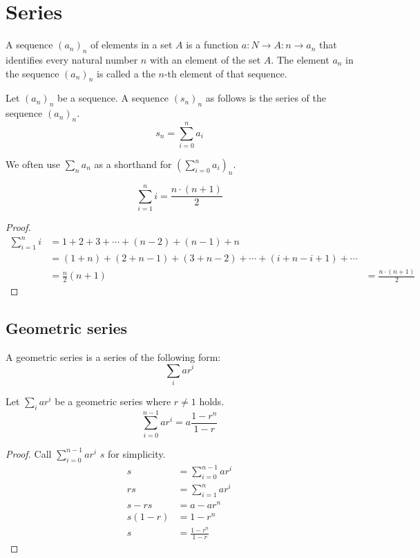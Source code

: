\documentclass[main.tex]{subfiles}
\begin{document}
\chapter{Series}

\begin{de}
  A sequence $(a_{n})_{n}$ of elements in a set $A$ is a function $a: N
  \rightarrow A: n \rightarrow a_{n}$ that identifies every natural number $n$ with an element of
  the set $A$. The element $a_{n}$ in the sequence $(a_{n})_{n}$ is called a the
  $n$-th element of that sequence.
\end{de}

\begin{de}
  Let $(a_{n})_{n}$ be a sequence.
  A sequence $(s_{n})_{n}$ as follows is the series of the sequence $(a_{n})_{n}$.
  \[ s_{n} = \sum_{i=0}^{n}a_{i} \]
\end{de}

\begin{de}
  We often use $\sum_{n}a_n$ as a shorthand for $\left(\sum_{i=0}^{n}a_{i}\right)_{n}$.
\end{de}

\begin{pr}
  \label{pr:sum-of-first-n-natural-numbers}
  \[
    \sum_{i=1}^n i = \frac{n\cdot(n+1)}{2}
  \]
  \begin{proof}
    \begin{align*}
      \sum_{i=1}^n i
      &= 1 + 2 + 3 + \dotsb + (n-2) + (n-1) + n\\
      &= (1 + n) + (2+n-1) + (3+n-2) + \dotsb + (i+n-i+1) + \dotsb\\
      &= \frac{n}{2} (n+1)
      &= \frac{n\cdot(n+1)}{2}
    \end{align*}
  \end{proof}
\end{pr}


\section{Geometric series}

\begin{de}
  A geometric series is a series of the following form:
  \[ \sum_{i}ar^{i} \]
\end{de}

\begin{pr}
  \label{pr:closed-form-expression-nth-term-of-geometric-series}
  Let $\sum_{i}ar^{i}$ be a geometric series where $r \neq 1$ holds.
  \[ \sum_{i=0}^{n-1}ar^{i} = a\frac{1 - r^{n}}{1 - r} \]

  \begin{proof}
    Call $\sum_{i=0}^{n-1}ar^{i}$ $s$ for simplicity.
    \begin{align*}
      s &= \sum_{i=0}^{n-1}ar^{i}\\
      rs &= \sum_{i=1}^{n}ar^{i}\\
      s-rs &= a - ar^{n}\\
      s(1 - r) &= 1 - r^{n}\\
      s &= \frac{1-r^{n}}{1-r}
    \end{align*}
  \end{proof}
\end{pr}
\end{document}
